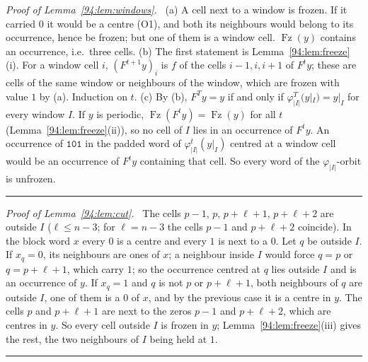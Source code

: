 \documentclass[10pt,a4paper]{article}
\newcommand{\qedmark}{\rule{1.1ex}{1.1ex}}
\newenvironment{proof}[1][Proof]{\par\smallskip\noindent\textit{#1.}\ }{\hfill\qedmark\par\smallskip}
\newcommand{\code}[1]{\mathtt{#1}}            %
\newcommand{\Fz}{\operatorname{Fz}}           %
\begin{document}
\begin{proof}[Proof of Lemma~\ref{94:lem:windows}]
(a) A cell next to a window is frozen. If it carried $0$ it would be a centre (O1), and both its neighbours would
belong to its occurrence, hence be frozen; but one of them is a window cell. $\Fz(y)$ contains an occurrence,
i.e.\ three cells.
(b) The first statement is Lemma~\ref{94:lem:freeze}(i). For a window cell $i$, $(F^{t+1}y)_i$ is $f$ of the cells
$i-1,i,i+1$ of $F^ty$; these are cells of the same window or neighbours of the window, which are frozen with value
$1$ by (a). Induction on $t$.
(c) By (b), $F^Ty=y$ if and only if $\varphi_{|I|}^T(y|_I)=y|_I$ for every window $I$. If $y$ is periodic,
$\Fz(F^ty)=\Fz(y)$ for all $t$ (Lemma~\ref{94:lem:freeze}(ii)), so no cell of $I$ lies in an occurrence of
$F^ty$. An occurrence of $\code{101}$ in the padded word of $\varphi_{|I|}^t(y|_I)$ centred at a window cell would
be an occurrence of $F^ty$ containing that cell. So every word of the $\varphi_{|I|}$-orbit is unfrozen.
\end{proof}

\begin{proof}[Proof of Lemma~\ref{94:lem:cut}]
The cells $p-1$, $p$, $p+\ell+1$, $p+\ell+2$ are outside $I$ ($\ell\le n-3$; for $\ell=n-3$ the cells $p-1$ and
$p+\ell+2$ coincide). In the block word $x$ every $0$ is a centre and every $1$ is next to a $0$. Let $q$ be
outside $I$. If $x_q=0$, its neighbours are ones of $x$; a neighbour inside $I$ would force $q=p$ or
$q=p+\ell+1$, which carry $1$; so the occurrence centred at $q$ lies outside $I$ and is an occurrence of $y$. If
$x_q=1$ and $q$ is not $p$ or $p+\ell+1$, both neighbours of $q$ are outside $I$, one of them is a $0$ of $x$, and
by the previous case it is a centre in $y$. The cells $p$ and $p+\ell+1$ are next to the zeros $p-1$ and
$p+\ell+2$, which are centres in $y$. So every cell outside $I$ is frozen in $y$;
Lemma~\ref{94:lem:freeze}(iii) gives the rest, the two neighbours of $I$ being held at $1$.
\end{proof}
\end{document}
